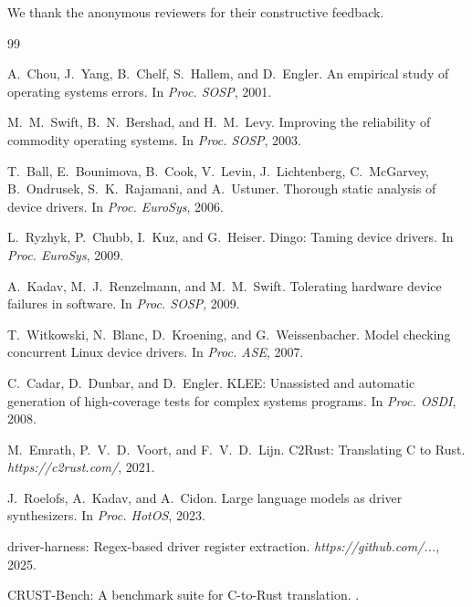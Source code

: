 \documentclass[sigplan, screen, review, anonymous]{acmart}
\begin{document}
\begin{acks}
We thank the anonymous reviewers for their constructive feedback.
\end{acks}


\begin{thebibliography}{99}

A.~Chou, J.~Yang, B.~Chelf, S.~Hallem, and D.~Engler.
\newblock An empirical study of operating systems errors.
\newblock In \emph{Proc. SOSP}, 2001.

M.~M.~Swift, B.~N.~Bershad, and H.~M.~Levy.
\newblock Improving the reliability of commodity operating systems.
\newblock In \emph{Proc. SOSP}, 2003.

T.~Ball, E.~Bounimova, B.~Cook, V.~Levin, J.~Lichtenberg, C.~McGarvey, B.~Ondrusek, S.~K.~Rajamani, and A.~Ustuner.
\newblock Thorough static analysis of device drivers.
\newblock In \emph{Proc. EuroSys}, 2006.

L.~Ryzhyk, P.~Chubb, I.~Kuz, and G.~Heiser.
\newblock Dingo: Taming device drivers.
\newblock In \emph{Proc. EuroSys}, 2009.

A.~Kadav, M.~J.~Renzelmann, and M.~M.~Swift.
\newblock Tolerating hardware device failures in software.
\newblock In \emph{Proc. SOSP}, 2009.

T.~Witkowski, N.~Blanc, D.~Kroening, and G.~Weissenbacher.
\newblock Model checking concurrent Linux device drivers.
\newblock In \emph{Proc. ASE}, 2007.

C.~Cadar, D.~Dunbar, and D.~Engler.
\newblock KLEE: Unassisted and automatic generation of high-coverage tests for complex systems programs.
\newblock In \emph{Proc. OSDI}, 2008.

M.~Emrath, P.~V.~D.~Voort, and F.~V.~D.~Lijn.
\newblock C2Rust: Translating C to Rust.
\newblock \emph{https://c2rust.com/}, 2021.

J.~Roelofs, A.~Kadav, and A.~Cidon.
\newblock Large language models as driver synthesizers.
\newblock In \emph{Proc. HotOS}, 2023.

\newblock driver-harness: Regex-based driver register extraction.
\newblock \emph{https://github.com/...}, 2025.

\newblock CRUST-Bench: A benchmark suite for C-to-Rust translation.
.


\end{thebibliography}
\end{document}
